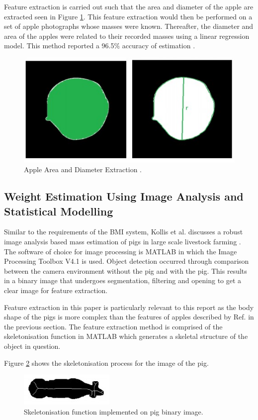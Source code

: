 \documentclass[conference]{IEEEtran}
\begin{document}
Feature extraction is carried out such that the area and diameter of the apple are extracted seen in Figure \ref{fig:diameterapples}.
This feature extraction would then be performed on a set of apple photographs whose masses were known.
Thereafter, the diameter and area of the apples were related to their recorded masses using a linear regression model.
This method reported a 96.5\% accuracy of estimation \cite{comert}.

\begin{figure}
    \centering
    \includegraphics[width=0.7\linewidth]{diameterapples.jpg}
    \caption{Apple Area and Diameter Extraction  \cite{comert}.}
    \label{fig:diameterapples}
\end{figure}

\subsection{Weight Estimation Using Image Analysis and Statistical Modelling}
Similar to the requirements of the BMI system, Kollis et al. discusses a robust image analysis based mass estimation of pigs in large scale livestock farming \cite{kollis2007weight}. 
The software of choice for image processing is MATLAB in which the Image Processing Toolbox V4.1 is used.
Object detection occurred through comparison between the camera environment without the pig and with the pig.
This results in a binary image that undergoes segmentation, filtering and opening to get a clear image for feature extraction.

Feature extraction in this paper is particularly relevant to this report as the body shape of the pigs is more complex than the features of apples described by Ref. \cite{comert} in the previous section. 
The feature extraction method is comprised of the skeletonisation function in MATLAB which generates a skeletal structure of the object in question.

Figure \ref{fig:pigskeleton} shows the skeletonisation process for the image of the pig.
\begin{figure}
    \centering
    \includegraphics[width=\linewidth]{pigskeleton.jpg}
    \caption{Skeletonisation function implemented on pig binary image\cite{kollis2007weight}.}
    \label{fig:pigskeleton}
\end{figure}
\end{document}
